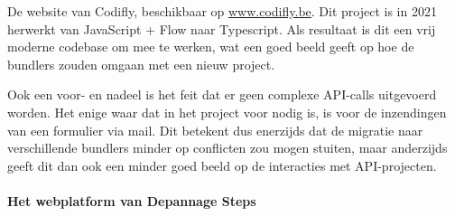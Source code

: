 De website van Codifly, beschikbaar op \href{https://www.codifly.be}{www.codifly.be}. Dit project is in 2021 herwerkt van JavaScript + Flow naar Typescript. Als resultaat is dit een vrij moderne codebase om mee te werken, wat een goed beeld geeft op hoe de bundlers zouden omgaan met een nieuw project.

Ook een voor- en nadeel is het feit dat er geen complexe API-calls uitgevoerd worden. Het enige waar dat in het project voor nodig is, is voor de inzendingen van een formulier via mail. Dit betekent dus enerzijds dat de migratie naar verschillende bundlers minder op conflicten zou mogen stuiten, maar anderzijds geeft dit dan ook een minder goed beeld op de interacties met API-projecten.

\paragraph{Het webplatform van Depannage Steps}

